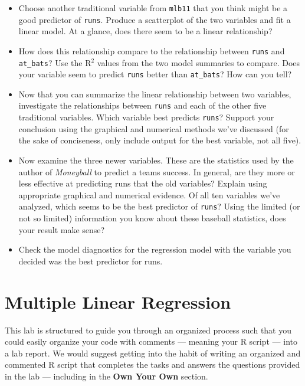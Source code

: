\documentclass[]{book}
\theoremstyle{definition}
\theoremstyle{definition}
\theoremstyle{definition}
\theoremstyle{remark}
\begin{document}
\begin{itemize}
\item
  Choose another traditional variable from \texttt{mlb11} that you think
  might be a good predictor of \texttt{runs}. Produce a scatterplot of
  the two variables and fit a linear model. At a glance, does there seem
  to be a linear relationship?
\item
  How does this relationship compare to the relationship between
  \texttt{runs} and \texttt{at\_bats}? Use the R\(^2\) values from the
  two model summaries to compare. Does your variable seem to predict
  \texttt{runs} better than \texttt{at\_bats}? How can you tell?
\item
  Now that you can summarize the linear relationship between two
  variables, investigate the relationships between \texttt{runs} and
  each of the other five traditional variables. Which variable best
  predicts \texttt{runs}? Support your conclusion using the graphical
  and numerical methods we've discussed (for the sake of conciseness,
  only include output for the best variable, not all five).
\item
  Now examine the three newer variables. These are the statistics used
  by the author of \emph{Moneyball} to predict a teams success. In
  general, are they more or less effective at predicting runs that the
  old variables? Explain using appropriate graphical and numerical
  evidence. Of all ten variables we've analyzed, which seems to be the
  best predictor of \texttt{runs}? Using the limited (or not so limited)
  information you know about these baseball statistics, does your result
  make sense?
\item
  Check the model diagnostics for the regression model with the variable
  you decided was the best predictor for runs.
\end{itemize}

\chapter{Multiple Linear Regression}\label{multiple-linear-regression}

This lab is structured to guide you through an organized process such
that you could easily organize your code with comments --- meaning your
R script --- into a lab report. We would suggest getting into the habit
of writing an organized and commented R script that completes the tasks
and answers the questions provided in the lab --- including in the
\textbf{Own Your Own} section.
\end{document}
